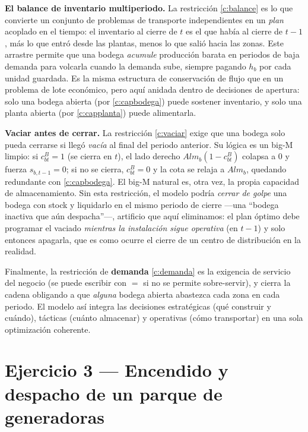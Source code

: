 \documentclass[11pt]{article}
\begin{document}
\textbf{El balance de inventario multiperiodo.} La restricción \eqref{c:balance} es lo que convierte un conjunto de problemas de transporte independientes en un \emph{plan} acoplado en el tiempo: el inventario al cierre de $t$ es el que había al cierre de $t-1$, más lo que entró desde las plantas, menos lo que salió hacia las zonas. Este arrastre permite que una bodega \emph{acumule} producción barata en periodos de baja demanda para volcarla cuando la demanda sube, siempre pagando $h_b$ por cada unidad guardada. Es la misma estructura de conservación de flujo que en un problema de lote económico, pero aquí anidada dentro de decisiones de apertura: solo una bodega abierta (por \eqref{c:capbodega}) puede sostener inventario, y solo una planta abierta (por \eqref{c:capplanta}) puede alimentarla.

\textbf{Vaciar antes de cerrar.} La restricción \eqref{c:vaciar} exige que una bodega solo pueda cerrarse si llegó \emph{vacía} al final del periodo anterior. Su lógica es un big-M limpio: si $c^{B}_{bt}=1$ (se cierra en $t$), el lado derecho $\mathit{Alm}_b(1-c^{B}_{bt})$ colapsa a $0$ y fuerza $s_{b,t-1}=0$; si no se cierra, $c^{B}_{bt}=0$ y la cota se relaja a $\mathit{Alm}_b$, quedando redundante con \eqref{c:capbodega}. El big-M natural es, otra vez, la propia capacidad de almacenamiento. Sin esta restricción, el modelo podría \emph{cerrar de golpe} una bodega con stock y liquidarlo en el mismo periodo de cierre —una ``bodega inactiva que aún despacha''—, artificio que aquí eliminamos: el plan óptimo debe programar el vaciado \emph{mientras la instalación sigue operativa} (en $t-1$) y solo entonces apagarla, que es como ocurre el cierre de un centro de distribución en la realidad.

Finalmente, la restricción de \textbf{demanda} \eqref{c:demanda} es la exigencia de servicio del negocio (se puede escribir con $=$ si no se permite sobre-servir), y cierra la cadena obligando a que \emph{alguna} bodega abierta abastezca cada zona en cada periodo. El modelo así integra las decisiones estratégicas (qué construir y cuándo), tácticas (cuánto almacenar) y operativas (cómo transportar) en una sola optimización coherente.

\fi

\newpage

\section{Ejercicio 3 — Encendido y despacho de un parque de generadoras}
\end{document}
